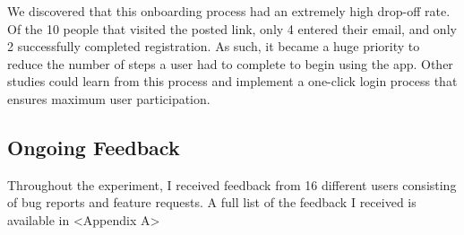 \par We discovered that this onboarding process had an extremely high drop-off rate. Of the 10 people that visited the posted link, only 4 entered their email, and only 2 successfully completed registration. As such, it became a huge priority to reduce the number of steps a user had to complete to begin using the app. Other studies could learn from this process and implement a one-click login process that ensures maximum user participation.

\subsection{Ongoing Feedback}
\par Throughout the experiment, I received feedback from 16 different users consisting of bug reports and feature requests. A full list of the feedback I received is available in <Appendix A>


